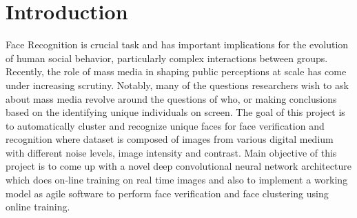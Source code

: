 \documentclass[a4paper,12pt, twoside]{NITKReport}
\begin{document}

\renewcommand{\chaptername}{CHAPTER}

\chapter{Introduction}
\label{chap1}

Face Recognition is crucial task and has important implications for the evolution of human social behavior, particularly complex interactions between groups. Recently, the role of mass media in shaping public perceptions at scale has come under increasing scrutiny. Notably, many of the questions researchers wish to ask about mass media revolve around the questions of who, or making conclusions based on the identifying unique individuals on screen. The goal of this project is to automatically cluster and recognize unique faces for face verification and recognition where dataset is composed of images from various digital medium with different noise levels, image intensity and contrast. Main objective of this project is to come up with a novel deep convolutional neural network architecture which does on-line training on real time images and also to implement a working model as agile software to perform face verification and face clustering using online training.  
	
\end{document}
